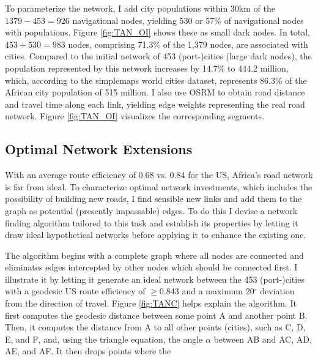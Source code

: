 \documentclass[a4paper]{article}
\begin{document}
To parameterize the network, I add city populations within 30km of the $1379-453 = 926$ navigational nodes, yielding 530 or 57\% of navigational nodes with populations. Figure \ref{fig:TAN_OI} shows these as small dark nodes. In total, $453 + 530 = 983$ nodes, comprising 71.3\% of the 1,379 nodes, are associated with cities. Compared to the initial network of 453 (port-)cities (large dark nodes), the population represented by this network increases by 14.7\% to 444.2 million, which, according to the simplemaps world cities dataset, represents 86.3\% of the African city population of 515 million. %
I also use OSRM to obtain road distance and travel time along each link, yielding edge weights representing the real road network. Figure \ref{fig:TAN_OI} visualizes the corresponding segments. 
 
\subsection{Optimal Network Extensions} \label{ss:ONE}
 
With an average route efficiency of 0.68 vs. 0.84 for the US, Africa's road network is far from ideal. To characterize optimal network investments, which includes the possibility of building new roads, I find sensible new links and add them to the graph as potential (presently impassable) edges. To do this I devise a network finding algorithm tailored to this task and establish its properties by letting it draw ideal hypothetical networks before applying it to enhance the existing one. \newline 

The algorithm begins with a complete graph where all nodes are connected and eliminates edges intercepted by other nodes which should be connected first. I illustrate it by letting it generate an ideal network between the 453 (port-)cities with a geodesic US route efficiency of $\geq$0.843 and a maximum 20$^\circ$ deviation from the direction of travel. Figure \ref{fig:TANC} helps explain the algorithm. It first computes the geodesic distance between some point A and another point B. Then, it computes the distance from A to all other points (cities), such as C, D, E, and F, and, using the triangle equation, the angle $\alpha$ between AB and AC, AD, AE, and AF.  It then drops points where the
\end{document}
